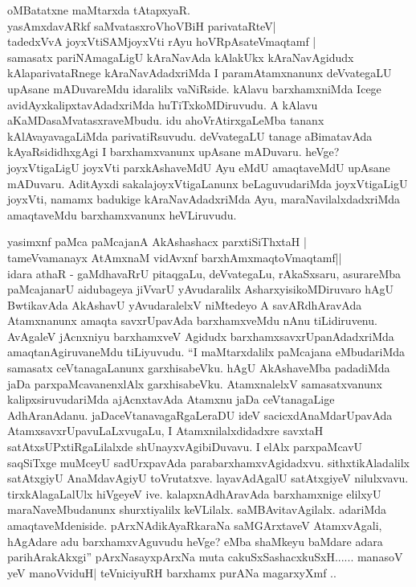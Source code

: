 \begin{artha}
oMBatatxne maMtarxda tAtapxyaR.\\
yasAmxdavARkf saMvatasxroV\s hoVBiH parivataRteV|\\
tadedxVvA joyxVtiSAMjoyxVti rAyu hoVRpAsateV\s maqtamf |\\
samasatx pariNAmagaLigU kAraNavAda kAlakUkx kAraNavAgidudx kAlaparivataRnege kAraNavAdadxriMda I paramAtamxnanunx deVvategaLU upAsane mADuvareMdu idaralilx vaNiRside. kAlavu barxhamxniMda Icege avidAyxkalipxtavAdadxriMda huTiTxkoMDiruvudu. A kAlavu aKaMDasaMvatasxraveMbudu. idu ahoVrAtirxgaLeMba tananx kAlAvayavagaLiMda parivatiRsuvudu. deVvategaLU tanage aBimatavAda kAyaRsididhxgAgi I barxhamxvanunx upAsane mADuvaru. heVge? joyxVtigaLigU joyxVti parxkAshaveMdU Ayu eMdU amaqtaveMdU upAsane mADuvaru. AditAyxdi sakalajoyxVtigaLanunx beLaguvudariMda joyxVtigaLigU joyxVti, namamx badukige kAraNavAdadxriMda Ayu, maraNavilalxdadxriMda amaqtaveMdu barxhamxvanunx heVLiruvudu.
\end{artha}


\begin{artha}
yasimxnf paMca paMcajanA AkAshashacx parxtiSiThxtaH |\\
tameVvamanayx AtAmxnaM vidAvxnf barxhAmxmaqtoV\s maqtamf||\\
idara athaR - gaMdhavaRrU pitaqgaLu, deVvategaLu, rAkaSxsaru, asurareMba paMcajanarU aidubageya jiVvarU yAvudaralilx AsharxyisikoMDiruvaro hAgU BwtikavAda AkAshavU yAvudaralelxV niMtedeyo A savARdhAravAda Atamxnanunx amaqta savxrUpavAda barxhamxveMdu nAnu tiLidiruvenu. AvAgaleV jAcnxniyu barxhamxveV Agidudx barxhamxsavxrUpanAdadxriMda amaqtanAgiruvaneMdu tiLiyuvudu. ``I maMtarxdalilx paMcajana eMbudariMda samasatx ceVtanagaLanunx garxhisabeVku. hAgU AkAshaveMba padadiMda jaDa parxpaMcavanenxlAlx garxhisabeVku. AtamxnalelxV samasatxvanunx kalipxsiruvudariMda ajAcnxtavAda Atamxnu jaDa ceVtanagaLige AdhAranAdanu. jaDaceVtanavagaRgaLeraDU ideV sacicxdAnaMdarUpavAda AtamxsavxrUpavuLaLxvugaLu, I Atamxnilalxdidadxre savxtaH satAtxsUPxtiRgaLilalxde shUnayxvAgibiDuvavu. I elAlx parxpaMcavU saqSiTxge muMceyU sadUrxpavAda parabarxhamxvAgidadxvu. sithxtikAladalilx satAtxgiyU AnaMdavAgiyU toVrutatxve. layavAdAgalU satAtxgiyeV nilulxvavu. tirxkAlagaLalUlx hiVgeyeV ive. kalapxnAdhAravAda barxhamxnige elilxyU maraNaveMbudanunx shurxtiyalilx keVLilalx. saMBAvitavAgilalx. adariMda amaqtaveMdeniside. pArxNAdikAyaRkaraNa saMGArxtaveV AtamxvAgali, hAgAdare adu barxhamxvAguvudu heVge? eMba shaMkeyu baMdare adara parihArakAkxgi''
pArxNasayxpArxNa muta cakuSxSashacxkuSxH...... manasoV yeV manoVviduH| teVniciyuRH barxhamx purANa magarxyXmf ..
\end{artha}

